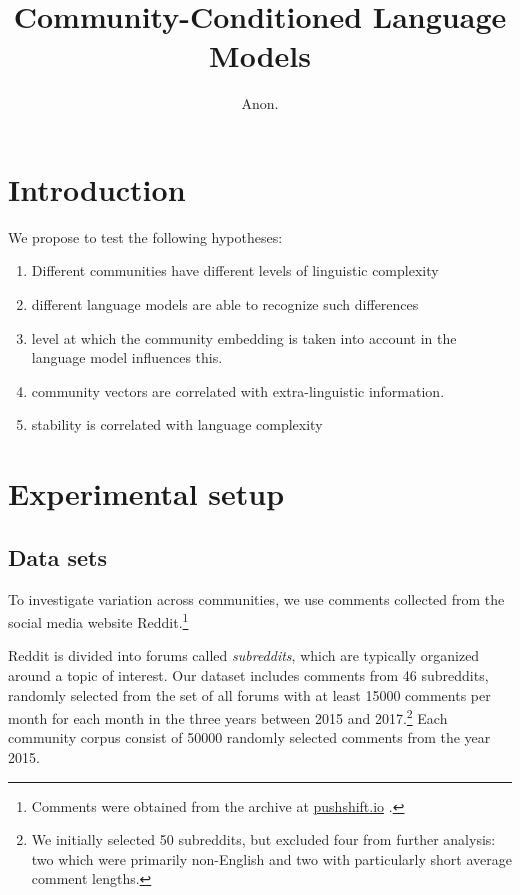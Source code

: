 \documentclass[11pt,a4paper]{article}
\title{Community-Conditioned Language Models}
\author{Anon.}
\date{}
\begin{document}
\maketitle
\begin{abstract}
\end{abstract}


\section{Introduction}

We propose to test the following hypotheses:

\begin{enumerate}
\item Different communities have different levels of linguistic
  complexity
\item different language models are able to recognize such differences
\item level at which the community embedding is taken into account in the language model influences this.
\item community vectors are correlated with extra-linguistic information.
\item stability is correlated with language complexity
\end{enumerate}

\section{Experimental setup}

\subsection{Data sets}

To investigate variation across communities, we use comments collected 
from the social media website Reddit.\footnote{Comments were obtained 
from the archive at \href{https://pushshift.io/}{pushshift.io} \cite{Baumgartner2020}.}

Reddit is divided into forums called \textit{subreddits}, 
which are typically organized around a topic of interest. 
Our dataset includes comments from \num{46} subreddits, 
randomly selected from the set of all forums 
with at least \num{15000} comments per month for each month 
in the three years between 2015 and 2017.\footnote{
We initially selected \num{50} subreddits, 
but excluded four from further analysis: 
two which were primarily non-English and two with particularly short average comment lengths.}
Each community corpus consist of \num{50000} randomly selected comments from the year 2015.
\end{document}

